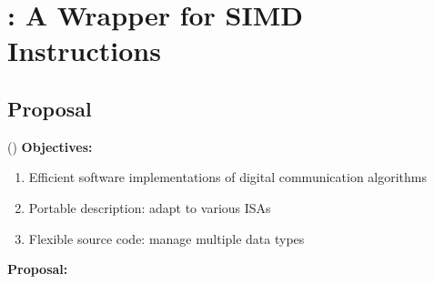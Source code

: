 
\section[MIPP]{\MIPP: A \Cxx Wrapper for SIMD Instructions}

\subsection[Proposal]{Proposal}

\begin{frame}{\longMIPP (\MIPP)}
  \vfill
  \textbf{Objectives:}

  \vspace{0.1cm}
  \begin{enumerate}
    \item Efficient software implementations of digital communication algorithms
    \item Portable description: adapt to various ISAs
    \item Flexible source code: manage multiple data types
  \end{enumerate}
  \vspace{0.3cm}
  \pause
  \textbf{Proposal:}


\end{frame}
